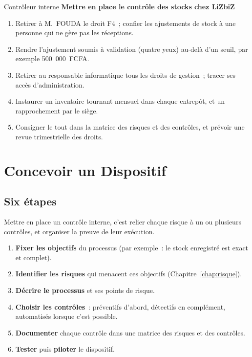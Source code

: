 \begin{boxmetier}{Contrôleur interne}
\textbf{Mettre en place le contrôle des stocks chez LiZbiZ}
\begin{enumerate}
    \item Retirer à M.~FOUDA le droit F4~; confier les ajustements de stock
          à une personne qui ne gère pas les réceptions.
    \item Rendre l'ajustement soumis à validation (quatre yeux) au-delà d'un
          seuil, par exemple 500~000~FCFA.
    \item Retirer au responsable informatique tous les droits de gestion~;
          tracer ses accès d'administration.
    \item Instaurer un inventaire tournant mensuel dans chaque entrepôt, et
          un rapprochement par le siège.
    \item Consigner le tout dans la matrice des risques et des contrôles, et
          prévoir une revue trimestrielle des droits.
\end{enumerate}
\end{boxmetier}

\section{Concevoir un Dispositif}
\label{sec:c03-concevoir}

\subsection{Six étapes}

Mettre en place un contrôle interne, c'est relier chaque risque à un ou
plusieurs contrôles, et organiser la preuve de leur exécution.

\begin{enumerate}
    \item \textbf{Fixer les objectifs} du processus (par exemple~: le stock
          enregistré est exact et complet).
    \item \textbf{Identifier les risques} qui menacent ces objectifs
          (Chapitre~\ref{chap:risque}).
    \item \textbf{Décrire le processus} et ses points de risque.
    \item \textbf{Choisir les contrôles}~: préventifs d'abord, détectifs en
          complément, automatisés lorsque c'est possible.
    \item \textbf{Documenter} chaque contrôle dans une matrice des risques
          et des contrôles.
    \item \textbf{Tester} puis \textbf{piloter} le dispositif.
\end{enumerate}

